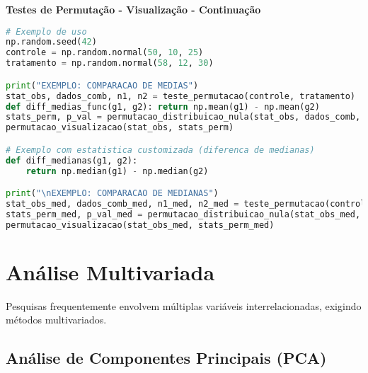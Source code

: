 \begin{examplebox}
\textbf{Testes de Permutação - Visualização - Continuação}

\begin{lstlisting}[language=Python]
# Exemplo de uso
np.random.seed(42)
controle = np.random.normal(50, 10, 25)
tratamento = np.random.normal(58, 12, 30)

print("EXEMPLO: COMPARACAO DE MEDIAS")
stat_obs, dados_comb, n1, n2 = teste_permutacao(controle, tratamento)
def diff_medias_func(g1, g2): return np.mean(g1) - np.mean(g2)
stats_perm, p_val = permutacao_distribuicao_nula(stat_obs, dados_comb, n1, n2, diff_medias_func)
permutacao_visualizacao(stat_obs, stats_perm)

# Exemplo com estatistica customizada (diferenca de medianas)
def diff_medianas(g1, g2):
    return np.median(g1) - np.median(g2)

print("\nEXEMPLO: COMPARACAO DE MEDIANAS")
stat_obs_med, dados_comb_med, n1_med, n2_med = teste_permutacao(controle, tratamento)
stats_perm_med, p_val_med = permutacao_distribuicao_nula(stat_obs_med, dados_comb_med, n1_med, n2_med, diff_medianas)
permutacao_visualizacao(stat_obs_med, stats_perm_med)
\end{lstlisting}
\end{examplebox}

\section{Análise Multivariada}

Pesquisas frequentemente envolvem múltiplas variáveis interrelacionadas, exigindo métodos multivariados.

\subsection{Análise de Componentes Principais (PCA)}

